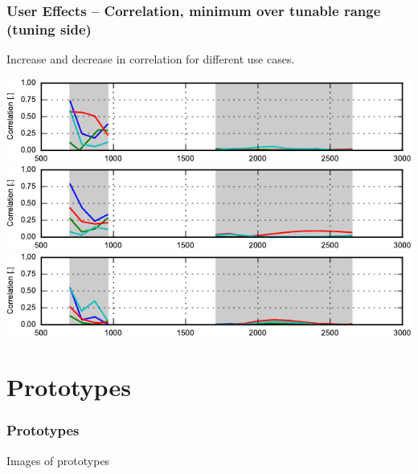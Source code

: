 \begin{frame}
    \frametitle{User Effects -- Correlation, minimum over tunable range (tuning side)}
    Increase and decrease in correlation for different use cases.
    \emptyline
    \begin{center}
        \includegraphics{img/soren/ue/design1lt/corrside.pdf}\\
        \includegraphics{img/soren/ue/design2sn/corrside.pdf}\\
        \includegraphics{img/soren/ue/design3hv/corrside.pdf}
    \end{center}
    \legendfooter
\end{frame}

\section{Prototypes}
\begin{frame}
    \frametitle{Prototypes}
    Images of prototypes
\end{frame}


